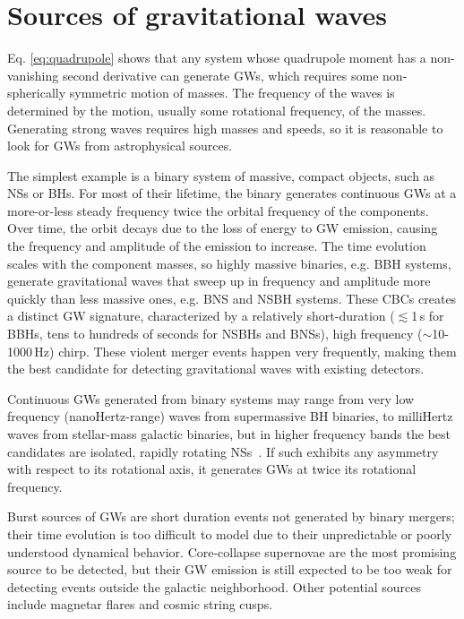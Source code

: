 \section{Sources of gravitational waves}\label{sec:gw-sources}

Eq. \ref{eq:quadrupole} shows that any system whose quadrupole moment has a non-vanishing second derivative can generate \acp{GW}, which requires some non-spherically symmetric motion of masses.
The frequency of the waves is determined by the motion, usually some rotational frequency, of the masses.
Generating strong waves requires high masses and speeds, so it is reasonable to look for \acp{GW} from astrophysical sources.

The simplest example is a binary system of massive, compact objects, such as \acp{NS} or \acp{BH}.
For most of their lifetime, the binary generates continuous \acp{GW} at a more-or-less steady frequency twice the orbital frequency of the components.
Over time, the orbit decays due to the loss of energy to \ac{GW} emission, causing the frequency and amplitude of the emission to increase.
The time evolution scales with the component masses, so highly massive binaries, e.g. \ac{BBH} systems, generate gravitational waves that sweep up in frequency and amplitude more quickly than less massive ones, e.g. \ac{BNS} and \ac{NSBH}  systems.
These \acp{CBC} creates a distinct \ac{GW} signature, characterized by a relatively short-duration ($\lesssim$1\,s for \acp{BBH}, tens to hundreds of seconds for \acp{NSBH} and \acp{BNS}), high frequency ($\sim$10-1000\,Hz) chirp.
These violent merger events happen very frequently, making them the best candidate for detecting gravitational waves with existing detectors.

Continuous \acp{GW} generated from binary systems may range from very low frequency (nanoHertz-range) waves from supermassive \ac{BH} binaries, to milliHertz waves from stellar-mass galactic binaries, but in higher frequency bands the best candidates are isolated, rapidly rotating \acp{NS}~\citep{Riles_2017}.
If such  exhibits any asymmetry with respect to its rotational axis, it generates \acp{GW} at twice its rotational frequency.

Burst sources of \acp{GW} are short duration events not generated by binary mergers; their time evolution is too difficult to model due to their unpredictable or poorly understood dynamical behavior.
Core-collapse supernovae are the most promising source to be detected, but their \ac{GW} emission is still expected to be too weak for detecting events outside the galactic neighborhood.
Other potential sources include magnetar flares and cosmic string cusps.


